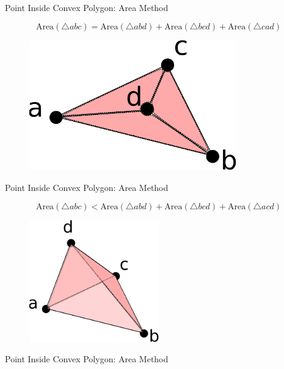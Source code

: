 \documentclass{beamer}
\begin{document}
\begin{frame}{Point Inside Convex Polygon: Area Method}


\[ \text{Area}(\triangle abc) = \text{Area}(\triangle abd) + \text{Area}(\triangle bcd) + \text{Area}(\triangle cad)\]

\begin{figure}[t]
	\centering
	\includegraphics[width=0.8\textwidth]{PointInsideArea.pdf}
\end{figure}


\end{frame}


\begin{frame}{Point Inside Convex Polygon: Area Method}


\[ \text{Area}(\triangle abc) < \text{Area}(\triangle abd) + \text{Area}(\triangle bcd) + \text{Area}(\triangle acd)\]

\begin{figure}[t]
	\centering
	\includegraphics[width=0.5\textwidth]{PointOutsideArea1.pdf}
\end{figure}


\end{frame}


\begin{frame}{Point Inside Convex Polygon: Area Method}




\end{frame}
\end{document}
